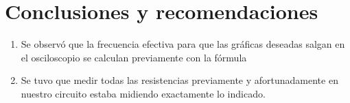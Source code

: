 \documentclass[a4paper,12pt]{report}
\begin{document}
\chapter{Conclusiones y recomendaciones}
\begin{enumerate}
\item Se observó que la frecuencia efectiva para que las gráficas deseadas salgan en el osciloscopio se calculan previamente con la fórmula 
\item Se tuvo que medir todas las resistencias previamente y afortunadamente en nuestro circuito estaba midiendo exactamente lo indicado.
\end{enumerate}
\begin{thebibliography}{99}  %

\end{thebibliography}
\end{document}
